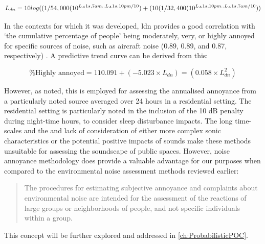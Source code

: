 \begin{dmath}
  L_{dn} = 10 log((1/54,000 (10^{L_{A}1s,7am..L_A1s,10pm/10})\\ + (10(1/32,400 (10^{L_A1s,10pm..L_A1s,7am/10}))
\end{dmath}


In the contexts for which it was developed, \gls{ldn} provides a good correlation with `the cumulative percentage of people' being moderately, very, or highly annoyed for specific sources of noise, such as aircraft noise (0.89, 0.89, and 0.87, respectively) \citep{Kryter1994}. A predictive trend curve can be derived from this:

$$
\% \text{Highly annoyed} = 110.091 + (-5.023 \times L_{dn}) = (0.058 \times L_{dn}^2)
$$

However, as noted, this is employed for assessing the annualised annoyance from a particularly noted source averaged over 24 hours in a residential setting. The residential setting is particularly noted in the inclusion of the 10 dB penalty during night-time hours, to consider sleep disturbance impacts. The long time-scales and the and lack of consideration of either more complex sonic characteristics or the potential positive impacts of sounds make these methods unsuitable for assessing the soundscape of public spaces. However, noise annoyance methodology does provide a valuable advantage for our purposes when compared to the environmental noise assessment methods reviewed earlier:

\begin{quote}
  The procedures for estimating subjective annoyance and complaints about environmental noise are intended for the assessment of the reactions of large groups or neighborhoods of people, and not specific individuals within a group.
  \begin{flushright}
    \citet[pg. 571]{Kryter1994}
  \end{flushright}
\end{quote}

This concept will be further explored and addressed in \cref{ch:ProbabilisticPOC}.


